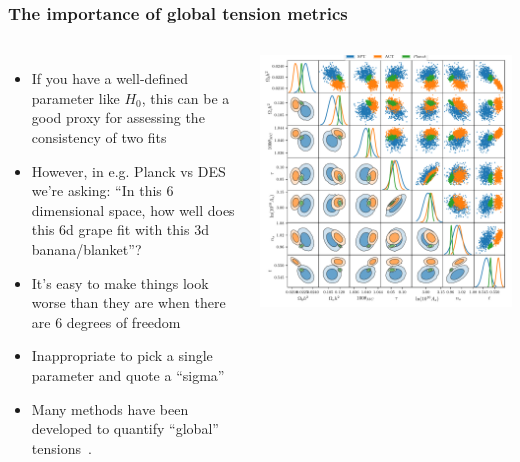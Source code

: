\documentclass[aspectratio=169]{beamer}
\begin{document}
\begin{frame}
    \frametitle{The importance of global tension metrics}
    \begin{columns}
        \begin{itemize}
            \item If you have a well-defined parameter like $H_0$, this can be a good proxy for assessing the consistency of two fits
            \item However, in e.g. Planck vs DES we're asking: ``In this 6 dimensional space, how well does this 6d grape fit with this 3d banana/blanket''?
            \item It's easy to make things look worse than they are when there are 6 degrees of freedom
            \item Inappropriate to pick a single parameter and quote a ``sigma''
            \item Many methods have been developed to quantify ``global'' tensions~.
        \end{itemize}
        
        \includegraphics[width=\textwidth]{figures/t.pdf}
    \end{columns}
\end{frame}
\end{document}
